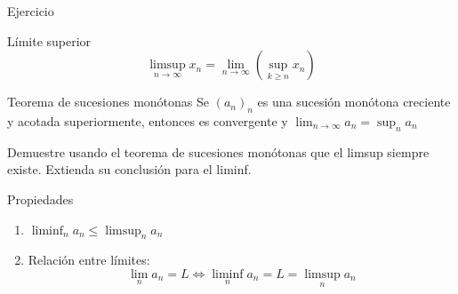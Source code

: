 \documentclass[14pt,aspectratio=169,xcolor=dvipsnames]{beamer}
\begin{document}
\begin{frame}[t]{Ejercicio}
    \begin{block}{Límite superior}
        $$\limsup_{n\to\infty}x_n = \lim_{n\to\infty}\left(\sup_{k\geq n}x_n\right) $$
    \end{block}
    \begin{block}{Teorema de sucesiones monótonas}
        Se $(a_n)_n$ es una sucesión monótona creciente y acotada superiormente, entonces es convergente y $ \lim_{n \to \infty}a_n = \sup_n a_n $
    \end{block}
    Demuestre usando el teorema de sucesiones monótonas que el limsup siempre existe. Extienda su conclusión para el liminf. 
\end{frame}
\begin{frame}{Propiedades}
    \begin{enumerate}
        \item $\liminf_n a_n \leq \limsup_n a_n$
        \item Relación entre límites: 
            $$ \lim_n a_n = L \Leftrightarrow \liminf_n a_n = L = \limsup_n a_n $$
    \end{enumerate}
\end{frame}
\begin{frame}
    \maketitle
\end{frame}
\end{document}
